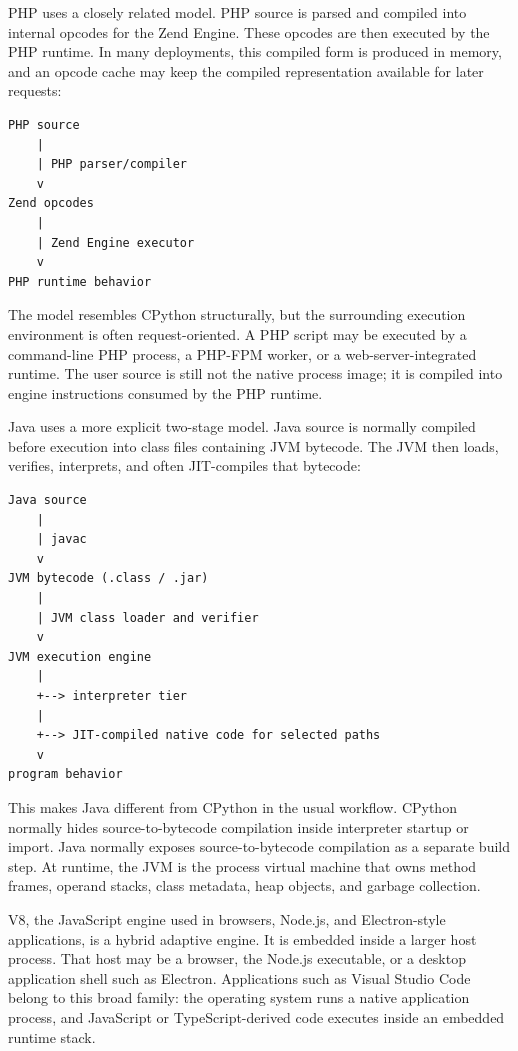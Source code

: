 \documentclass[a4paper,twoside]{report}
\begin{document}
PHP uses a closely related model. PHP source is parsed and compiled into internal opcodes for the Zend Engine. These opcodes are then executed by the PHP runtime. In many deployments, this compiled form is produced in memory, and an opcode cache may keep the compiled representation available for later requests:

\begin{verbatim}
PHP source
    |
    | PHP parser/compiler
    v
Zend opcodes
    |
    | Zend Engine executor
    v
PHP runtime behavior
\end{verbatim}

The model resembles CPython structurally, but the surrounding execution environment is often request-oriented. A PHP script may be executed by a command-line PHP process, a PHP-FPM worker, or a web-server-integrated runtime. The user source is still not the native process image; it is compiled into engine instructions consumed by the PHP runtime.

Java uses a more explicit two-stage model. Java source is normally compiled before execution into class files containing JVM bytecode. The JVM then loads, verifies, interprets, and often JIT-compiles that bytecode:

\begin{verbatim}
Java source
    |
    | javac
    v
JVM bytecode (.class / .jar)
    |
    | JVM class loader and verifier
    v
JVM execution engine
    |
    +--> interpreter tier
    |
    +--> JIT-compiled native code for selected paths
    v
program behavior
\end{verbatim}

This makes Java different from CPython in the usual workflow. CPython normally hides source-to-bytecode compilation inside interpreter startup or import. Java normally exposes source-to-bytecode compilation as a separate build step. At runtime, the JVM is the process virtual machine that owns method frames, operand stacks, class metadata, heap objects, and garbage collection.

V8, the JavaScript engine used in browsers, Node.js, and Electron-style applications, is a hybrid adaptive engine. It is embedded inside a larger host process. That host may be a browser, the Node.js executable, or a desktop application shell such as Electron. Applications such as Visual Studio Code belong to this broad family: the operating system runs a native application process, and JavaScript or TypeScript-derived code executes inside an embedded runtime stack.
\end{document}
